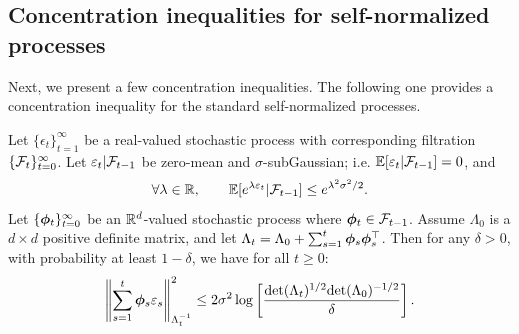 	


\subsection{Concentration inequalities for self-normalized processes}

Next, we present a few concentration inequalities. The following one provides a concentration inequality for the standard self-normalized processes.
\begin{theorem} \label{thm:self_norm}
Let $\{\epsilon_t\}_{t = 1}^\infty$ be a real-valued stochastic process with corresponding filtration $\{\mathcal{F}_t\}_{t = 0}^\infty$. Let $\varepsilon_t | \mathcal{F}_{t-1}$ be zero-mean and $\sigma$-subGaussian; i.e. $\mathbb{E}[\varepsilon_t | \mathcal{F}_{t-1}] = 0$, and
\begin{equation*}
\forall \lambda \in \mathbb{R}, \qquad \mathbb{E}[e^{\lambda \varepsilon_t} |\mathcal{F}_{t-1}] \le e^{\lambda^2 \sigma^2/2}. 
\end{equation*} 
Let $\{\bm{\phi}_t\}_{t = 0}^\infty$ be an $\mathbb{R}^d$-valued stochastic process where $\bm{\phi}_t \in \mathcal{F}_{t-1}$. Assume $\Lambda_0$ is a $d\times d$ positive definite matrix, and let $\Lambda_t = \Lambda_0 + \sum_{s=1}^t \bm{\phi}_s \bm{\phi}_s^{\top}$. Then for any $\delta>0$, with probability at least $1-\delta$, we have for all $t \ge 0$:
\begin{equation*}
\left\|{\sum_{s = 1}^t \bm{\phi}_s \varepsilon_s }\right\|^2_{\Lambda_t^{-1}}
\le 2\sigma^2 \log \left[ \frac{\mathrm{det}(\Lambda_t)^{1/2}\mathrm{det}(\Lambda_0)^{-1/2}}{\delta} \right]. 
\end{equation*}
\end{theorem}


